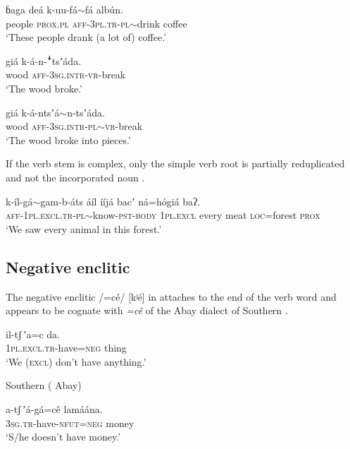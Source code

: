 \documentclass[output=paper]{langsci/langscibook}
\begin{document}
\ea\label{ex:ahlandc:37}
\gll
ɓaga  deá  k-uu-fá$\sim$fá   alb\'{u}n.   \\
people  \textsc{prox.pl}  \textsc{aff-3pl.tr-pl}$\sim$drink   coffee \\
\glt
‘These people drank (a lot of) coffee.’ 
\z

\ea\label{ex:ahlandc:38}
\gll
giá     k-á-n-\textsf{ꜜ}tsʼáda. \\
wood \textsc{aff-3sg.intr}{}-\textsc{vr-}break \\
\glt
‘The wood broke.’
\z

\ea\label{ex:ahlandc:39}
\gll
giá       k-á-ntsʼá$\sim$n-tsʼáda.  \\
wood  \textsc{aff-3sg.intr}{}-\textsc{pl}$\sim$\textsc{vr}{}-break \\
\glt
 ‘The wood broke into pieces.’
\z

If the verb stem is complex, only the simple verb root is partially reduplicated and not the incorporated noun . 

\ea\label{ex:ahlandc:40}
\gll
k-íl-gá$\sim$gam-b-áts                                        áíl           ííjá      bacʼ   ná=h\'{o}giá  baʔ. \\
\textsc{aff-1pl.excl.tr-pl}$\sim$know-\textsc{pst-body} \textsc{1pl.excl} every  meat  \textsc{loc}=forest \textsc{prox} \\
\glt
‘We saw every animal in this forest.’
\z


\subsection{Negative enclitic}\label{sec:ahlandc:4.8}

The negative enclitic /=cé/ [kʲé] in   attaches to the end of the verb word and appears to be cognate with \textit{=c\^{e}} of the  Abay dialect of Southern   \citep[cf.][241-242]{Ahland2012Gumuz}. 

\ea\label{ex:ahlandc:41}

\gll
{il-tʃ\,ʼa=c}   da. \\
\textsc{1pl.excl.tr}-have=\textsc{neg}     thing \\
\glt
  ‘We (\textsc{excl}) don’t have anything.’
\z

\ea\label{ex:ahlandc:42}
Southern  ( Abay)

\gll
  a-{tʃ\,ʼá}-gá=c\^{e}                      lamáána. \\
\textsc{3sg.tr}{}-have-\textsc{nfut=neg  } money \\
\glt
  ‘S/he doesn’t have money.’
\z
\end{document}
